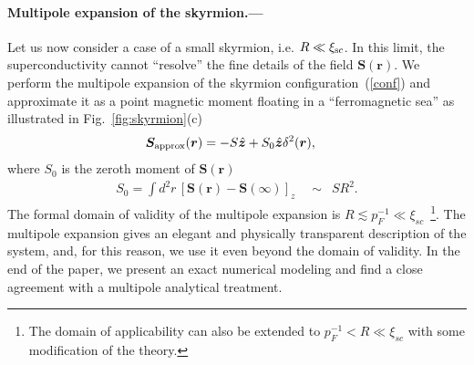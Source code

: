 \documentclass[twocolumn,showpacs,floatfix,longbibliography]{revtex4-1}
\begin{document}
\paragraph*{Multipole expansion of the skyrmion.---} \label{sec:analytics}
Let us now consider a case of a small skyrmion, i.e. $R\ll\xi_{\rm sc}$. In this limit, the superconductivity cannot ``resolve'' the fine details of the field $\bm S(\bm r)$. We perform the multipole expansion of the skyrmion configuration~(\ref{conf}) and approximate it as a point magnetic moment floating in a ``ferromagnetic sea'' as illustrated in Fig.~\ref{fig:skyrmion}(c)
\begin{align}
	\bm S_{\rm approx}(\bm r) & =  - S \hat{\bm z} + S_0 \hat{\bm z} \delta^2(\bm r),  \label{vr}
\end{align}
where $S_0$ is the zeroth moment of $\bm S(\bm r)$
\begin{align}
	S_0 = \int  d^2r \, \left[\bm S(\bm r)-\bm S(\infty)\right]_z  \quad \sim \,\,\,SR^2. \label{S0}
\end{align}
The formal domain of validity of the multipole expansion is $R \lesssim p_F^{-1} \ll \xi_{sc}$~\footnote{The domain of applicability can also be extended to $p_F^{-1}<R\ll \xi_{sc}$ with some modification of the theory.}. The multipole expansion gives an elegant and physically transparent description of the system, and, for this reason, we use it even beyond the domain of validity. In the end of the paper, we present an exact numerical modeling and find a close agreement with a multipole analytical treatment.
\end{document}
